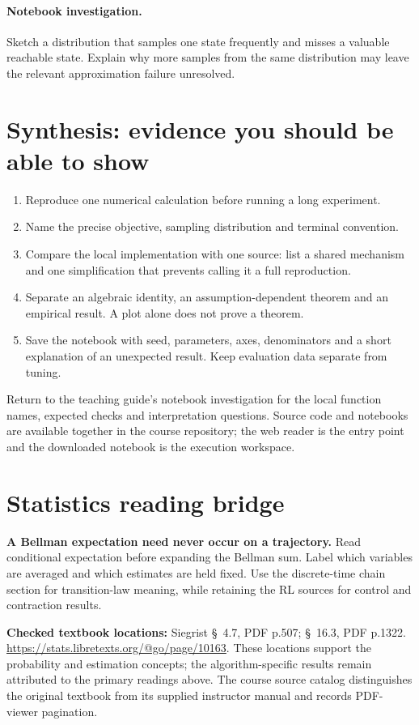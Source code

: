 \documentclass[11pt]{scrartcl}
\begin{document}
\paragraph{Notebook investigation.} Sketch a distribution that samples one state frequently and misses a valuable reachable state. Explain why more samples from the same distribution may leave the relevant approximation failure unresolved.

\section*{Synthesis: evidence you should be able to show}
\begin{enumerate}
\item Reproduce one numerical calculation before running a long experiment.
\item Name the precise objective, sampling distribution and terminal convention.
\item Compare the local implementation with one source: list a shared mechanism
and one simplification that prevents calling it a full reproduction.
\item Separate an algebraic identity, an assumption-dependent theorem and an
empirical result. A plot alone does not prove a theorem.
\item Save the notebook with seed, parameters, axes, denominators and a short
explanation of an unexpected result. Keep evaluation data separate from tuning.
\end{enumerate}
Return to the teaching guide's notebook investigation for the local function
names, expected checks and interpretation questions. Source code and notebooks
are available together in the course repository; the web reader is the entry
point and the downloaded notebook is the execution workspace.
\section*{Statistics reading bridge}
\textbf{A Bellman expectation need never occur on a trajectory.} Read conditional expectation before expanding the Bellman sum. Label which variables are averaged and which estimates are held fixed. Use the discrete-time chain section for transition-law meaning, while retaining the RL sources for control and contraction results.

\textbf{Checked textbook locations:} Siegrist \S~4.7, PDF p.507; \S~16.3, PDF p.1322. \url{https://stats.libretexts.org/@go/page/10163}. These locations support the probability and estimation concepts; the algorithm-specific results remain attributed to the primary readings above. The course source catalog distinguishes the original textbook from its supplied instructor manual and records PDF-viewer pagination.
\end{document}
